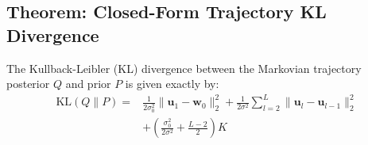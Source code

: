 \subsection{Theorem: Closed-Form Trajectory KL Divergence}
\label{subsec:theorem}
\begin{theorem}
The Kullback-Leibler (KL) divergence between the Markovian trajectory posterior $Q$ and prior $P$ is given exactly by:
\begin{equation}
\begin{split}
\text{KL}(Q \| P) = &\frac{1}{2\sigma_0^2} \|\mathbf{u}_1 - \mathbf{w}_0\|_2^2 + \frac{1}{2\sigma^2} \sum_{l=2}^L \|\mathbf{u}_l - \mathbf{u}_{l-1}\|_2^2 \\
&+ \left( \frac{\sigma_0^2}{2\sigma^2} + \frac{L-2}{2} \right) K
\end{split}
\end{equation}
\end{theorem}

